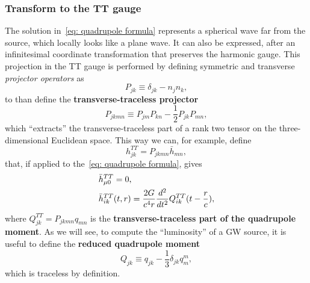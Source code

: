\subsubsection{Transform to the TT gauge}
The solution in~\eqref{eq: quadrupole formula} represents a spherical wave far from the source, which locally looks like a plane wave.
It can also be expressed, after an infinitesimal coordinate transformation that preserves the harmonic gauge.
This projection in the TT gauge is performed by defining symmetric and transverse \textit{projector operators} as
\[
    P_{jk}\equiv \delta_{jk} - n_j n_k,
\]
to than define the \textbf{transverse-traceless projector} 
\begin{equation}
    P_{jkmn}\equiv P_{jm}P_{kn}-\frac{1}{2}P_{jk}P_{mn},
    \label{eq: transverse-traceless projector}
\end{equation}
which ``extracts'' the transverse-traceless part of a rank two tensor on the three-dimensional Euclidean space.
This way we can, for example, define
\[
    h_{jk}^{TT} = P_{jkmn}\bar{h}_{mn},
\]
that, if applied to the~\eqref{eq: quadrupole formula}, gives
\begin{align}
   &\bar{h}^{TT}_{\mu 0} =0,\notag\\
   &\bar{h}^{TT}_{ik}(t,r) = \frac{2G}{c^4r}\frac{d^2}{dt^2}Q^{TT}_{ik}(t-\frac{r}{c}),
   \label{eq: TT part of quadrupole moment}
\end{align}
where $Q_{jk}^{TT} = P_{jkmn}q_{mn}$ is the \textbf{transverse-traceless part of the quadrupole moment}.
As we will see, to compute the ``luminosity'' of a GW source, it is useful to define the \textbf{reduced quadrupole moment}
\begin{equation}
    Q_{jk} \equiv q_{jk} - \frac{1}{3}\delta_{jk}q_m^m, 
    \label{eq: reduced quadrupole moment}
\end{equation}
which is traceless by definition.

